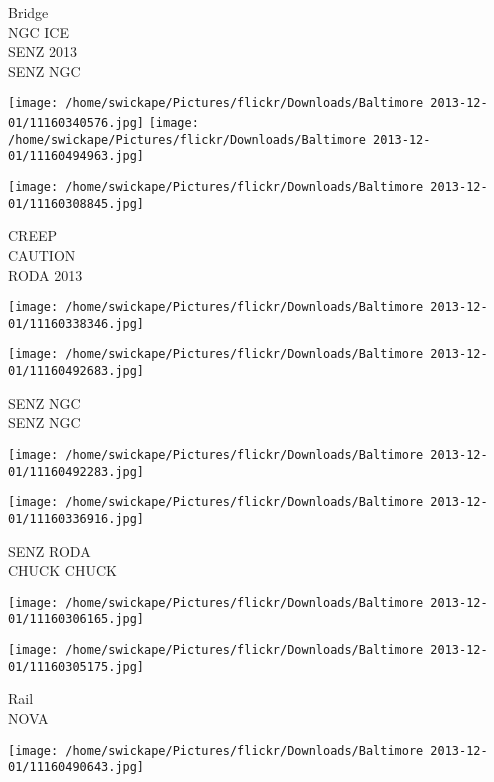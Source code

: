 \documentclass[10pt,letterpaper]{article}
\begin{document}
Bridge\\
NGC ICE\\
SENZ 2013\\
SENZ NGC\\
\pagebreak

\texttt{[image: /home/swickape/Pictures/flickr/Downloads/Baltimore 2013-12-01/11160340576.jpg]}
\texttt{[image: /home/swickape/Pictures/flickr/Downloads/Baltimore 2013-12-01/11160494963.jpg]}

\texttt{[image: /home/swickape/Pictures/flickr/Downloads/Baltimore 2013-12-01/11160308845.jpg]}

CREEP\\
CAUTION\\
RODA 2013\\
\pagebreak

\texttt{[image: /home/swickape/Pictures/flickr/Downloads/Baltimore 2013-12-01/11160338346.jpg]}

\vspace{0.25in}
\texttt{[image: /home/swickape/Pictures/flickr/Downloads/Baltimore 2013-12-01/11160492683.jpg]}

SENZ NGC\\
SENZ NGC\\
\pagebreak

\texttt{[image: /home/swickape/Pictures/flickr/Downloads/Baltimore 2013-12-01/11160492283.jpg]}

\vspace{0.25in}
\texttt{[image: /home/swickape/Pictures/flickr/Downloads/Baltimore 2013-12-01/11160336916.jpg]}

SENZ RODA\\
CHUCK CHUCK\\
\pagebreak

\texttt{[image: /home/swickape/Pictures/flickr/Downloads/Baltimore 2013-12-01/11160306165.jpg]}

\vspace{0.25in}
\texttt{[image: /home/swickape/Pictures/flickr/Downloads/Baltimore 2013-12-01/11160305175.jpg]}

Rail\\
NOVA\\
\pagebreak

\texttt{[image: /home/swickape/Pictures/flickr/Downloads/Baltimore 2013-12-01/11160490643.jpg]}
\end{document}
